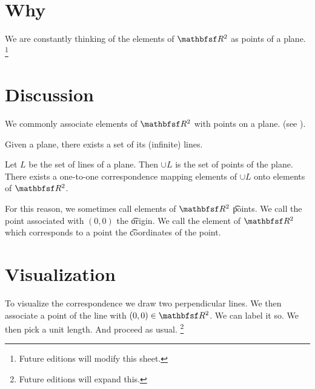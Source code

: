 
\section*{Why}

We are constantly thinking of the elements of $\R ^2$ as points of a plane.
  \ifhmode\unskip\fi\footnote{
Future editions will modify this sheet.
  }

\section*{Discussion}

We commonly associate elements of $\R ^2$ with points on a plane. (see ).

\begin{principle}
Given a plane, there exists a set of its (infinite) lines.
\end{principle}

\begin{principle}
Let $L$ be the set of lines of a plane.
Then $\cup L$ is the set of points of the plane.
There exists a one-to-one correspondence mapping elements of $\cup L$ onto elements of $\R ^2$.
\end{principle}
For this reason, we sometimes call elements of $\R ^2$ \t{points}.
We call the point associated with $(0, 0)$ the \t{origin}.
We call the element of $\R ^2$ which corresponds to a point the \t{coordinates} of the point.

\section*{Visualization}

To visualize the correspondence we draw two perpendicular lines.
We then associate a point of the line with $(0, 0) \in \R ^2$.
We can label it so.
We then pick a unit length.
And proceed as usual.
  \ifhmode\unskip\fi\footnote{
Future editions will expand this.
  }

